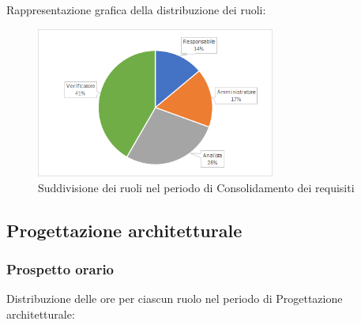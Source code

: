 		Rappresentazione grafica della distribuzione dei ruoli:
		\begin{figure}[h]
			\centering
			\includegraphics[width=0.7\textwidth]{./res/img/consolidamentoRequisiti_pe.png}
			\caption{Suddivisione dei ruoli nel periodo di Consolidamento dei requisiti}
		\end{figure}

\newpage
\subsection{Progettazione architetturale}
	\subsubsection{Prospetto orario}
		Distribuzione delle ore per ciascun ruolo nel periodo di Progettazione architetturale:

